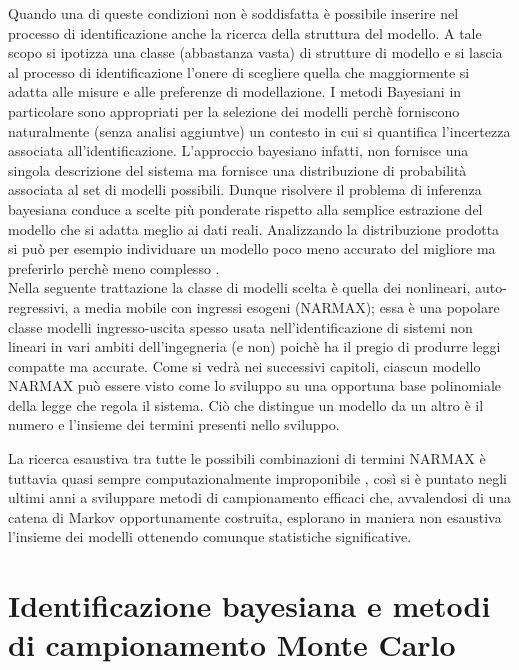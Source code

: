 \documentclass[10pt,a4paper,oneside,openany,noindent]{book}
\begin{document}
Quando una di queste condizioni non è soddisfatta è possibile inserire nel processo di identificazione anche la ricerca della struttura del modello.
A tale scopo si ipotizza una classe (abbastanza vasta) di strutture di modello
e si lascia al processo di identificazione l’onere di scegliere quella che maggiormente si adatta
alle misure e alle preferenze di modellazione. I metodi Bayesiani in particolare sono appropriati per la selezione dei
modelli perchè forniscono naturalmente (senza analisi aggiuntve) un contesto in cui
si quantifica l’incertezza associata all’identificazione. L’approccio bayesiano infatti, non fornisce una singola descrizione del sistema ma fornisce una distribuzione di
probabilità associata al set di modelli possibili. Dunque risolvere il problema di
inferenza bayesiana conduce a scelte più  ponderate rispetto alla semplice estrazione
del modello che si adatta meglio ai dati reali. Analizzando la distribuzione prodotta
si può per esempio individuare un modello poco meno accurato del migliore ma
preferirlo perchè meno complesso .\\
Nella seguente trattazione la classe di modelli scelta è quella dei nonlineari, auto-regressivi, a media mobile
con ingressi esogeni (NARMAX); essa è una popolare classe modelli ingresso-uscita
spesso usata nell’identificazione di sistemi non lineari in vari ambiti dell’ingegneria
(e non) poichè ha il pregio di produrre leggi compatte ma accurate.
Come si vedrà nei successivi capitoli, ciascun modello NARMAX può essere visto
come lo sviluppo su una opportuna base polinomiale della legge che
regola il sistema. Ciò che distingue un modello da un altro è il numero e l’insieme
dei termini presenti nello sviluppo.

La ricerca esaustiva tra tutte le possibili combinazioni di termini NARMAX è tuttavia quasi sempre computazionalmente improponibile , così si è puntato negli ultimi
anni a sviluppare metodi di campionamento efficaci che, avvalendosi di una catena
di Markov opportunamente costruita, esplorano in maniera non esaustiva l’insieme
dei modelli ottenendo comunque statistiche significative.
\chapter{Identificazione bayesiana e metodi
di campionamento Monte Carlo}
\end{document}
